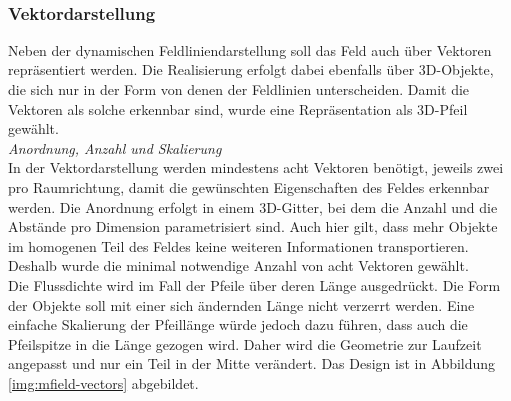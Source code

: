 \vspace{4px}
\begin{center}
	\\
\end{center}

\subsubsection{Vektordarstellung}
\label{sec-4-4-2}
Neben der dynamischen Feldliniendarstellung soll das Feld auch über Vektoren repräsentiert werden. Die Realisierung erfolgt dabei ebenfalls über 3D-Objekte, die sich nur in der Form von denen der Feldlinien unterscheiden. Damit die Vektoren als solche erkennbar sind, wurde eine Repräsentation als 3D-Pfeil gewählt.\\
 
\textit{Anordnung, Anzahl und Skalierung}\\
In der Vektordarstellung werden mindestens acht Vektoren benötigt, jeweils zwei pro Raumrichtung, damit die gewünschten Eigenschaften des Feldes erkennbar werden. Die Anordnung erfolgt in einem 3D-Gitter, bei dem die Anzahl und die Abstände pro Dimension parametrisiert sind. Auch hier gilt, dass mehr Objekte im homogenen Teil des Feldes keine weiteren Informationen transportieren. Deshalb wurde die minimal notwendige Anzahl von acht Vektoren gewählt.\\
\noindent\hspace*{5mm}
Die Flussdichte wird im Fall der Pfeile über deren Länge ausgedrückt. Die Form der Objekte soll mit einer sich ändernden Länge nicht verzerrt werden. Eine einfache Skalierung der Pfeillänge würde jedoch dazu führen, dass auch die Pfeilspitze in die Länge gezogen wird. Daher wird die Geometrie zur Laufzeit angepasst und nur ein Teil in der Mitte verändert. Das Design ist in Abbildung \ref{img:mfield-vectors} abgebildet.\\

